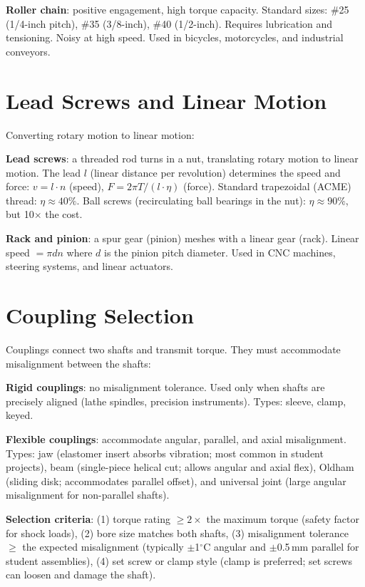 \documentclass[11pt,letterpaper,twoside,openany]{book}
\newcommand{\degC}{\ensuremath{{}^{\circ}\text{C}}}
\begin{document}
\textbf{Roller chain}: positive engagement, high torque capacity. Standard sizes: \#25 (1/4-inch pitch), \#35 (3/8-inch), \#40 (1/2-inch). Requires lubrication and tensioning. Noisy at high speed. Used in bicycles, motorcycles, and industrial conveyors.

\section{Lead Screws and Linear Motion}
Converting rotary motion to linear motion:

\textbf{Lead screws}: a threaded rod turns in a nut, translating rotary motion to linear motion. The lead $l$ (linear distance per revolution) determines the speed and force: $v = l \cdot n$ (speed), $F = 2\pi T/(l \cdot \eta)$ (force). Standard trapezoidal (ACME) thread: $\eta \approx 40\%$. Ball screws (recirculating ball bearings in the nut): $\eta \approx 90\%$, but 10$\times$ the cost.

\textbf{Rack and pinion}: a spur gear (pinion) meshes with a linear gear (rack). Linear speed $= \pi d n$ where $d$ is the pinion pitch diameter. Used in CNC machines, steering systems, and linear actuators.

\section{Coupling Selection}
Couplings connect two shafts and transmit torque. They must accommodate misalignment between the shafts:

\textbf{Rigid couplings}: no misalignment tolerance. Used only when shafts are precisely aligned (lathe spindles, precision instruments). Types: sleeve, clamp, keyed.

\textbf{Flexible couplings}: accommodate angular, parallel, and axial misalignment. Types: jaw (elastomer insert absorbs vibration; most common in student projects), beam (single-piece helical cut; allows angular and axial flex), Oldham (sliding disk; accommodates parallel offset), and universal joint (large angular misalignment for non-parallel shafts).

\textbf{Selection criteria}: (1) torque rating $\geq 2\times$ the maximum torque (safety factor for shock loads), (2) bore size matches both shafts, (3) misalignment tolerance $\geq$ the expected misalignment (typically $\pm$1\degC{} angular and $\pm$0.5\,mm parallel for student assemblies), (4) set screw or clamp style (clamp is preferred; set screws can loosen and damage the shaft).
\end{document}
